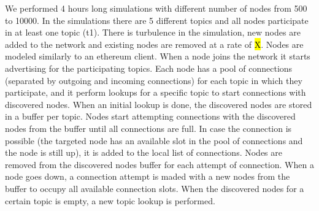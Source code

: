 We performed 4 hours long simulations with different number of nodes from 500 to 10000.
In the simulations there are 5 different topics and all nodes participate in at least one topic (t1).
There is turbulence in the simulation, new nodes are added to the network and existing nodes are removed at a rate of \hl{X}.
Nodes are modeled similarly to an ethereum client. 
When a node joins the network it starts advertising for the participating topics.
Each node has a pool of connections (separated by outgoing and incoming connections) for each topic in which they participate, and it perform lookups
for a specific topic to start connections with discovered nodes.
When an initial lookup is done, the discovered nodes are stored in a buffer per topic.
Nodes start attempting connections with the discovered nodes from the buffer until all connections 
are full.
In case the connection is possible (the targeted node has an available slot in the pool of connections and the node is still up), it is added 
to the local list of connections.
Nodes are removed from the discovered nodes buffer for each attempt of connection.
When a node goes down, a connection attempt is maded with a new nodes from the buffer to occupy all available connection slots.
When the discovered nodes for a certain topic is empty, a new topic lookup is performed.





